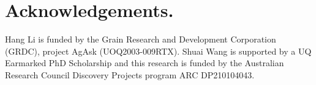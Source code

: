 \documentclass[sigconf,natbib=true,anonymous=false]{acmart}
\begin{document}



\maketitle






%

%



\section*{Acknowledgements.}
Hang Li is funded by the Grain Research and Development Corporation (GRDC), project AgAsk (UOQ2003-009RTX). Shuai Wang is supported by a UQ Earmarked PhD Scholarship and this research is funded by the Australian Research Council Discovery Projects program ARC DP210104043.





\end{document}
